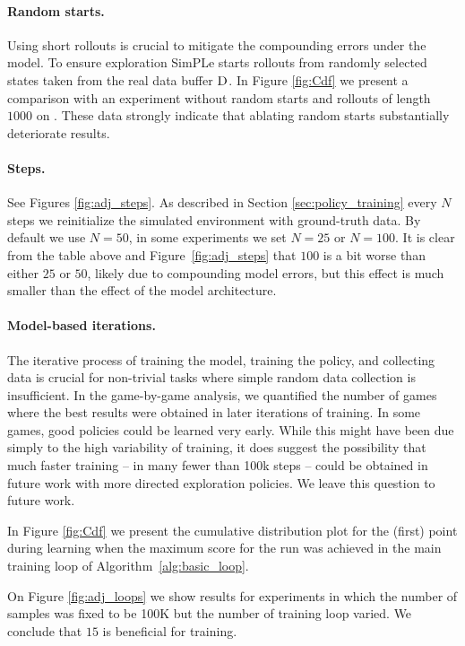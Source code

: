 \paragraph{Random starts.} Using short rollouts is crucial to mitigate the compounding errors under the model. To ensure exploration SimPLe starts rollouts from randomly selected states taken from the real data buffer $\textsc{D}$. In Figure \ref{fig:Cdf} we present a comparison with an experiment without random starts and rollouts of length $1000$ on \seaquest. These data strongly indicate that ablating random starts substantially deteriorate results.  

\paragraph{Steps.} See Figures \ref{fig:adj_steps}. As described in Section \ref{sec:policy_training} every $N$ steps we reinitialize the simulated environment with ground-truth data. By default we use $N=50$, in some experiments 
we set $N=25$ or $N=100$. It is clear from the table above and Figure~\ref{fig:adj_steps} that $100$ is a bit worse than either $25$ or $50$, likely due to compounding model errors,
but this effect is much smaller than the effect of the model architecture.

\paragraph{Model-based iterations.}
The iterative process of training the model, training the policy, and collecting data is crucial for non-trivial tasks where simple random data collection is insufficient. In the game-by-game analysis, we quantified the number of games where the best results were obtained in later iterations of training. In some games, good policies could be learned very early. While this might have been due simply to the high variability of training, it does suggest the possibility that much faster training -- in many fewer than 100k steps -- could be obtained in future work with more directed exploration policies. We leave this question to future work.

In Figure \ref{fig:Cdf} we present the cumulative distribution plot for the (first) point during learning when the maximum score for the run was achieved in the main training loop of Algorithm~\ref{alg:basic_loop}.

On Figure \ref{fig:adj_loops} we show results for experiments in which the number of samples was fixed to be 100K but the number of training loop varied. We conclude that $15$ is beneficial for training.

